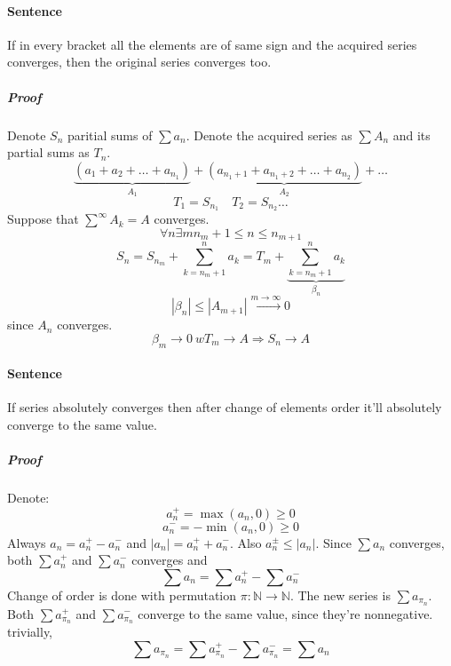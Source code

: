 \paragraph{Sentence}
If in every bracket all the elements are of same sign and the acquired series converges, then the original series converges too.
\subparagraph{Proof}
Denote $S_n$ paritial sums of $\sum a_n$. Denote the acquired series as $\sum A_n$ and its partial sums as $T_n$.
$$\underbrace{\left(a_1+a_2+\dots+a_{n_1}\right)}_{A_1}+\underbrace{\left(a_{n_1+1}+a_{n_1+2}+\dots+a_{n_2}\right)}_{A_2}+\dots$$
$$T_1 = S_{n_1} \quad T_2 = S_{n_2} \dots$$
Suppose that $\sum^\infty A_k = A$ converges. $$\forall n \exists m n_m+1 \leq n \leq n_{m+1}$$
$$S_n= S_{n_m}+ \sum_{k=n_m+1}^n a_k = T_m + \underbrace{\sum_{k=n_m+1}^n a_k}_{\beta_n}$$
$$\left|\beta_n\right|\leq \left|A_{m+1}\right| \stackrel{m\to \infty}{\to} 0$$
since $A_n$ converges.
$$\beta_m \to 0 \:w T_m \to A \Rightarrow S_n \to A$$
\paragraph{Sentence}
If series absolutely converges then after change of elements order it'll absolutely converge to the same value.
\subparagraph{Proof}
Denote:
$$a_n^+ = \max (a_n,0) \geq 0$$
$$a_n^- = -\min (a_n,0) \geq 0$$
Always $a_n = a_n^+ - a_n^-$ and $|a_n| = a_n^+ + a_n^-$. Also $a_n^\pm \leq |a_n|$. 
Since $\sum a_n$ converges, both $\sum a_n^+$ and $\sum a_n^-$ converges and $$\sum a_n = \sum a_n^+ - \sum a_n^-$$
Change of order is done with permutation $\pi: \mathbb{N} \to \mathbb{N}$. The new series is $\sum a_{\pi_n}$. Both $\sum a_{\pi_n}^+$ and  $\sum a_{\pi_n}^-$ converge to the same value, since they're nonnegative. trivially,
$$\sum a_{\pi_n} = \sum a_{\pi_n}^+ - \sum a_{\pi_n}^- = \sum a_n$$

